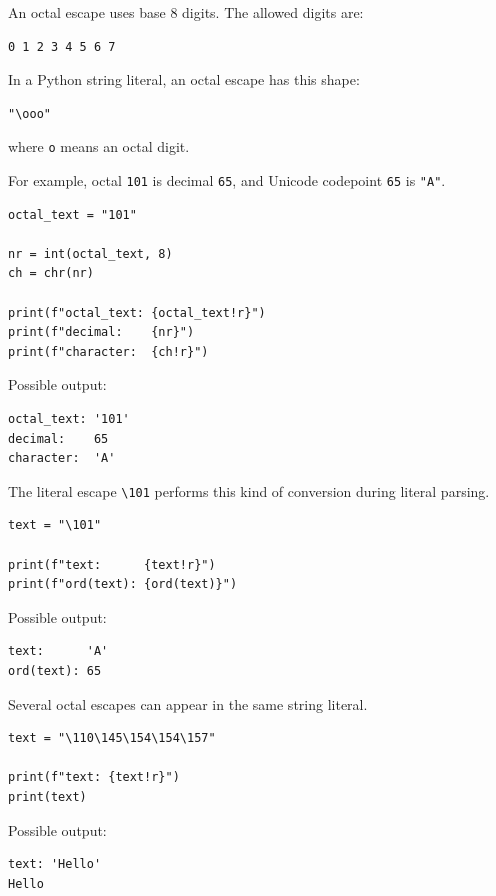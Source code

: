 An octal escape uses base 8 digits. The allowed digits are:

\begin{verbatim}
0 1 2 3 4 5 6 7
\end{verbatim}

In a Python string literal, an octal escape has this shape:

\begin{verbatim}
"\ooo"
\end{verbatim}

where \texttt{o} means an octal digit.

For example, octal \texttt{101} is decimal \texttt{65}, and Unicode codepoint \texttt{65} is \texttt{"A"}.

\begin{verbatim}
octal_text = "101"

nr = int(octal_text, 8)
ch = chr(nr)

print(f"octal_text: {octal_text!r}")
print(f"decimal:    {nr}")
print(f"character:  {ch!r}")
\end{verbatim}

Possible output:

\begin{verbatim}
octal_text: '101'
decimal:    65
character:  'A'
\end{verbatim}

The literal escape \texttt{\textbackslash 101} performs this kind of conversion during literal parsing.

\begin{verbatim}
text = "\101"

print(f"text:      {text!r}")
print(f"ord(text): {ord(text)}")
\end{verbatim}

Possible output:

\begin{verbatim}
text:      'A'
ord(text): 65
\end{verbatim}

Several octal escapes can appear in the same string literal.

\begin{verbatim}
text = "\110\145\154\154\157"

print(f"text: {text!r}")
print(text)
\end{verbatim}

Possible output:

\begin{verbatim}
text: 'Hello'
Hello
\end{verbatim}

